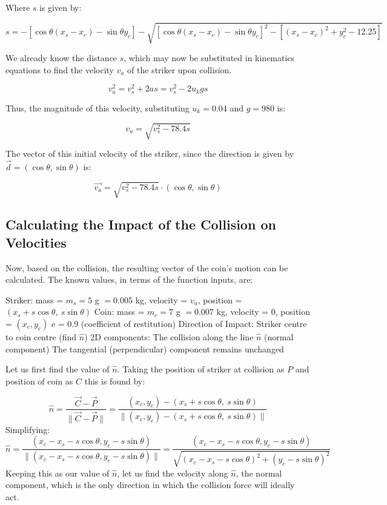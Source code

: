 \documentclass[10pt]{article}
\begin{document}
Where $s$ is given by:

\[
s = -\left[\cos \theta (x_s - x_c) - \sin \theta y_c\right] 
- 
\sqrt{
\left[\cos \theta (x_s - x_c) - \sin \theta y_c\right]^2 
- 
\left[(x_s - x_c)^2 + y_c^2 - 12.25\right]
}
\]

We already know the distance $s$, which may now be substituted in kinematics equations to find the velocity $v_{a}$ of the striker upon collision.

\[
v_a^2 = v_s^2+2as=v_s^2 - 2u_kgs
\]

Thus, the magnitude of this velocity, substituting $u_k = 0.04$ and $g=980$ is:

\[
v_a = \sqrt{v_s^2 - 78.4s}
\]

The vector of this initial velocity of the striker, since the direction is given by $\vec{d} = (\cos\theta,\sin\theta)$ is:

\[
\vec{v_a} = \sqrt{v_s^2 - 78.4s} \cdot (\cos\theta,\sin\theta)
\]

\subsection{Calculating the Impact of the Collision on Velocities}
Now, based on the collision, the resulting vector of the coin's motion can be calculated. The known values, in terms of the function inputs, are:
\begin{outline}
    \1 Striker: mass = $m_s = 5$ g $= 0.005$ kg, velocity = $v_a$, position = $\left( x_s + s \cos \theta,\ s \sin \theta \right)$
    \1 Coin: mass = $m_c = 7$ g $= 0.007$ kg, velocity = 0, position = $(x_c,y_c)$
    \1 e = 0.9 (coefficient of restitution)
    \1 Direction of Impact: Striker centre  to coin centre (find $\hat{n}$)
    \1 2D components:
        \2 The collision along the line $\hat{n}$ (normal component)
        \2 The tangential (perpendicular) component remains unchanged
\end{outline}

Let us first find the value of $\hat{n}$. Taking the position of striker at collision as $P$ and position of coin as $C$ this is found by:

\[
\hat{n} = \frac{\vec{C}-\vec{P}}{\|\vec{C}-\vec{P}\|} = \frac{(x_c, y_c)-( x_s + s \cos \theta,\ s \sin \theta)}{\|(x_c, y_c)-( x_s + s \cos \theta,\ s \sin \theta)\|}
\]
Simplifying:
\[
\hat{n} = \frac{(x_c - x_s - s \cos \theta, y_c - s\sin\theta)}{\|(x_c - x_s - s \cos \theta, y_c - s\sin\theta)\|} = \frac{(x_c - x_s - s \cos \theta, y_c - s\sin\theta)}{\sqrt{(x_c - x_s - s \cos \theta)^2 + (y_c - s\sin\theta)^2}}
\]
Keeping this as our value of $\hat{n}$, let us find the velocity along $\hat{n}$, the normal component, which is the only direction in which the collision force will ideally act.
\end{document}
